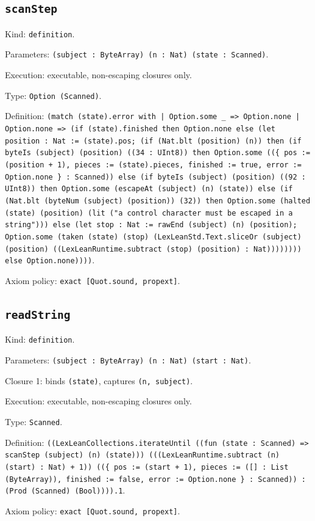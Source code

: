 \documentclass[11pt]{article}
\begin{document}
\subsection*{\texttt{scanStep}}
\noindent Kind: \texttt{definition}.\par
\noindent Parameters: \texttt{(subject : ByteArray) (n : Nat) (state : Scanned)}.\par
\noindent Execution: executable, non-escaping closures only.\par
\noindent Type: \texttt{Option (Scanned)}.\par
\noindent Definition: \texttt{(match (state).error with | Option.some \_ => Option.none | Option.none => (if (state).finished then Option.none else (let position : Nat := (state).pos; (if (Nat.blt (position) (n)) then (if byteIs (subject) (position) ((34 : UInt8)) then Option.some ((\{ pos := (position + 1), pieces := (state).pieces, finished := true, error := Option.none \} : Scanned)) else (if byteIs (subject) (position) ((92 : UInt8)) then Option.some (escapeAt (subject) (n) (state)) else (if (Nat.blt (byteNum (subject) (position)) (32)) then Option.some (halted (state) (position) (lit ("a control character must be escaped in a string"))) else (let stop : Nat := rawEnd (subject) (n) (position); Option.some (taken (state) (stop) (LexLeanStd.Text.sliceOr (subject) (position) ((LexLeanRuntime.subtract (stop) (position) : Nat)))))))) else Option.none))))}.\par
\noindent Axiom policy: \texttt{exact [Quot.sound, propext]}.\par
\subsection*{\texttt{readString}}
\noindent Kind: \texttt{definition}.\par
\noindent Parameters: \texttt{(subject : ByteArray) (n : Nat) (start : Nat)}.\par
\noindent Closure 1: binds \texttt{(state)}, captures \texttt{(n, subject)}.\par
\noindent Execution: executable, non-escaping closures only.\par
\noindent Type: \texttt{Scanned}.\par
\noindent Definition: \texttt{((LexLeanCollections.iterateUntil ((fun (state : Scanned) => scanStep (subject) (n) (state))) (((LexLeanRuntime.subtract (n) (start) : Nat) + 1)) ((\{ pos := (start + 1), pieces := ([] : List (ByteArray)), finished := false, error := Option.none \} : Scanned)) : (Prod (Scanned) (Bool)))).1}.\par
\noindent Axiom policy: \texttt{exact [Quot.sound, propext]}.\par
\end{document}
